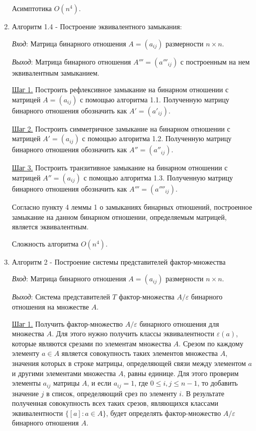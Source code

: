 \documentclass[spec, och, labwork]{shiza}
\begin{document}
\begin{enumerate}
                Асимптотика $O(n^4)$.

                \item Алгоритм 1.4 - Построение эквивалентного замыкания:
                
                \textit{Вход}: Матрица бинарного отношения $A = (a_{ij})$ размерности $n \times n$.

                \textit{Выход}: Матрица бинарного отношения $A''' = (a'''_{ij})$ с построенным на нем эквивалентным
                замыканием.

                \underline{Шаг 1.} Построить рефлексивное замыкание на бинарном отношении с матрицей $A = (a_{ij})$ с помощью алгоритма 1.1.
                Полученную матрицу бинарного отношения обозначить как $A' = (a'_{ij})$.

                \underline{Шаг 2.} Построить симметричное замыкание на бинарном отношении с матрицей $A' = (a_{ij})$ с помощью алгоритма 1.2.
                Полученную матрицу бинарного отношения обозначить как $A'' = (a''_{ij})$.

                \underline{Шаг 3.} Построить транзитивное замыкание на бинарном отношении с матрицей $A'' = (a_{ij})$ с помощью алгоритма 1.3.
                Полученную матрицу бинарного отношения обозначить как $A''' = (a''''_{ij})$.
                
                Согласно пункту 4 леммы 1 о замыканиях бинарных отношений, построенное замыкание на
                данном бинарном отношении, определяемым матрицей, является эквивалентным.
            
                Сложность алгоритма $O(n^4)$.

                \item Алгоритм 2 - Построение системы представителей фактор-множества
                
                \textit{Вход}: Матрица бинарного отношения $A = (a_{ij})$ размерности $n \times n$.

                \textit{Выход}: Система представителей $T$ фактор-множества $A/\varepsilon$ бинарного отношения на множестве $A$.

                \underline{Шаг 1.} Получить фактор-множество $A/\varepsilon$ бинарного отношения для множества $A$. Для
                этого нужно получить классы эквивалентности $\varepsilon(a)$, которые являются срезами по элементам
                множества $A$. Срезом по каждому элементу $a \in A$ является совокупность таких элементов множества $A$,
                значения которых в строке матрицы, определяющей связи между элементом $a$ и другими элементами множества $A$, 
                равны единице. Для этого проверим элементы $a_{ij}$ матрицы $A$, и если $a_{ij} = 1$, где $0 \leq i, j \leq n - 1$, 
                то добавить значение $j$ в список, определяющий срез по элементу $i$. В результате полученная совокупность всех таких 
                срезов, являющихся классами эквивалентности $\{[a]: a \in A\}$, будет определять фактор-множество $A/\varepsilon$ 
                бинарного отношения $A$.


\end{enumerate}
\end{document}
